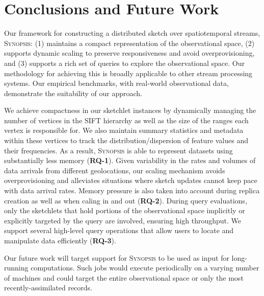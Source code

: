 \section{Conclusions and Future Work}
\label{sec:conclusions}
Our framework for constructing a distributed sketch over spatiotemporal streams, \textsc{Synopsis}: (1) maintains a compact representation of the observational space, (2) supports dynamic scaling to preserve responsiveness and avoid overprovisioning, and (3) supports a rich set of queries to explore the observational space. Our methodology for achieving this is broadly applicable to other stream processing systems.  Our empirical benchmarks, with real-world observational data, demonstrate the suitability of our approach.

We achieve compactness in our sketchlet instances by dynamically managing the number of vertices in the SIFT hierarchy as well as the size of the ranges each vertex is responsible for. We also maintain summary statistics and metadata within these vertices to track the distribution/dispersion of feature values and their frequencies. As a result, \textsc{Synopsis} is able to represent datasets using substantially less memory (\textbf{RQ-1}). Given variability in the rates and volumes of data arrivals from different geolocations, our scaling mechanism avoids overprovisioning and alleviates situations where sketch updates cannot keep pace with data arrival rates. Memory pressure is also taken into account during replica creation as well as when caling in and out (\textbf{RQ-2}). During query evaluations, only the sketchlets that hold portions of the observational space implicitly or explicitly targeted by the query are involved, ensuring high throughput. We support several high-level query operations that allow users to locate and manipulate data efficiently (\textbf{RQ-3}).

Our future work will target support for \textsc{Synopsis} to be used as input for long-running computations. Such jobs would execute periodically on a varying number of machines and could target the entire observational space or only the most recently-assimilated records.
